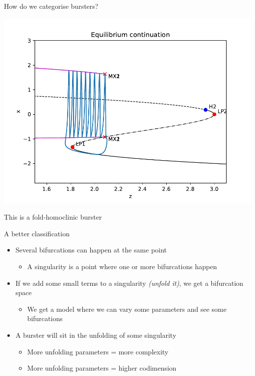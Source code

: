 \documentclass[presentation]{beamer}
\begin{document}
\begin{frame}[label={sec:orgf787f39}]{How do we categorise bursters?}
\begin{center}
\includegraphics[trim={0cm 0.75cm 0cm 1.25cm}, clip,height=.75\textheight]{./burster_diagram.pdf}
\end{center}

This is a fold-homoclinic burster
\end{frame}



\begin{frame}[label={sec:org2ac7944}]{A better classification}
\begin{itemize}[<+->]
\item Several bifurcations can happen at the same point
\begin{itemize}
\item A singularity is a point where one or more bifurcations happen
\end{itemize}
\item If we add some small terms to a singularity \emph{(unfold it)}, we get a bifurcation space
\begin{itemize}
\item We get a model where we can vary some parameters and see some bifurcations
\end{itemize}
\item A burster will sit in the unfolding of some singularity
\begin{itemize}
\item More unfolding parameters = more complexity
\item More unfolding parameters = higher codimension
\end{itemize}
\end{itemize}
\end{frame}
\end{document}
